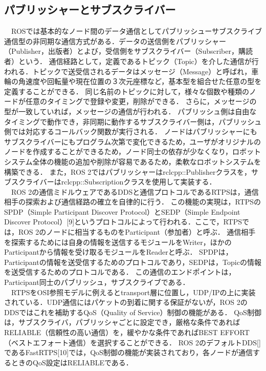 \subsection{パブリッシャーとサブスクライバー}
　ROSでは基本的なノード間のデータ通信としてパブリッシューサブスクライブ通信型の非同期な通信方式がある．データの送信側をパブリッシャー（Publisher，出版者）とよび，受信側をサブスクライバー（Subscriber，購読者）という．
通信経路として，定義であるトピック（Topic）を介した通信が行われる．トピックで送受信されるデータはメッセージ（Message）と呼ばれ，車輪の角速度や回転量や現在位置の３次元座標など，基本型を組合せた任意の型を定義することができる．
同じ名前のトピックに対して，様々な個数や種類のノードが任意のタイミングで登録や変更，削除ができる．
さらに，メッセージの型が一致していれば，メッセージの通信が行われる．
パブリッシュ側は自由なタイミングで動作でき，非同期に動作するサブスクライバー側は，パブリッシュ側では対応するコールバック関数が実行される．
ノードはパブリッシャーにもサブスクライバーにもプログラム次第で変化できるため，ユーザがオリジナルのノードを作成することができるため，ノード同士の依存が少なくなり，ロボットシステム全体の機能の追加や削除が容易であるため，柔軟なロボットシステムを構築できる．
また，ROS 2ではパブリッシャーはrclcpp::Publisherクラスを，サブスクライバーはrclcpp::Subscriptionクラスを使用して実装する．
\\　ROS 2の通信ミドルウェアであるDDSと通信プロトコルであるRTPSは，通信相手の探索および通信経路の確立を自律的に行う．
この機能の実現は，RTPSのSPDP（Simple Participant Discover Protocol）とSEDP（Simple Endpoint Discover Protocol）[9]というプロトコルによって行われる．ここで，RTPSでは，ROS 2のノードに相当するものをParticipant（参加者）と呼ぶ．
通信相手を探索するためには自身の情報を送信するモジュールをWriter，ほかのParticipantから情報を受け取るモジュールをReaderと呼ぶ．
SPDPは，Participantの情報を送受信するためのプロトコルであり，SEDPは，Topicの情報を送受信するためのプロトコルである．
この通信のエンドポイントは，Participant同士のパブリッシュ，サブスクライブである．
\\　RTPSをOSI参照モデルに例えるとtransport層に位置し，UDP/IPの上に実装されている．UDP通信にはパケットの到着に関する保証がないが，ROS 2のDDSではこれを補助するQoS（Quality of Service）制御の機能がある．
QoS制御は，サブスクライバ，パブリッシャごとに設定でき，厳格な条件であればRELIABLE（信頼性の高い通信）を，緩やかな条件であればBEST EFFORT（ベストエフォート通信）を選択することができる．
ROS 2のデフォルトDDS[]であるFastRTPS[10]では，QoS制御の機能が実装されており，各ノードが通信するときのQoS設定はRELIABLEである．
